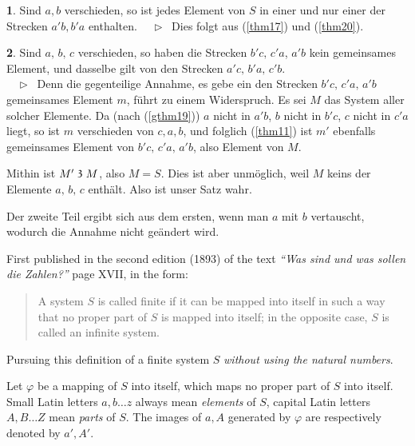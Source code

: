 \documentclass[leqno,hidelinks,a4paper]{article}
\theoremstyle{definition}
\newtheorem{satz}{\protect\satzname}
\newcommand{\satzname}{}
\renewcommand{\satzname}{\hspace{-4pt}.\ Satz}%
\renewcommand{\satzname}{\hspace{-4pt}.\ Theorem}%
\newcommand\Beweis{\medskip \newline $ \phantom{'.'} \rhd \ $}%
\newcommand\beweis{ $ \phantom{'.'} \rhd \ $}%
\newcommand\TeilVon{\mathrel{\raisebox{0.45ex}{$\mathfrak{3}$}}}
\begin{document}
\begin{paracol}{2}
\begin{satz}\label{gthm23}
Sind $a, b$ verschieden, so ist jedes Element von $S$ in einer und nur einer
der Strecken $a'b, b'a$ enthalten.
\Beweis
Dies folgt aus (\ref{thm17}) und (\ref{thm20}).
\end{satz}

\begin{satz}\label{gthm24}
Sind $a,\, b,\, c$ verschieden, so haben die Strecken $b'c,\, c'a$, $a'b$ kein
gemeinsames Element, und dasselbe gilt von den Strecken $a'c,\, b'a,\, c'b$.
\ \\

\noindent \beweis
Denn die gegenteilige Annahme, es gebe ein den Strecken $b'c,\, c'a,\, a'b$
gemeinsames Element $m$, führt zu einem Widerspruch. Es sei $M$ das System aller
solcher Elemente. Da (nach (\ref{gthm19})) $a$ nicht in $a'b$, $ b$ nicht in
$b'c$, $c$ nicht in $c'a$ liegt, so ist $m$ verschieden von $c, a, b$, und folglich
(\ref{thm11}) ist $m'$ ebenfalls gemeinsames Element von $b'c,\, c'a,\, a'b$,
also Element von $M$.

Mithin ist $M' \TeilVon M$, also $M = S$. Dies ist aber unmöglich, weil $M$ keins
der Elemente $a,\, b,\, c$ enthält. Also ist unser Satz wahr.

Der zweite Teil ergibt sich aus dem ersten, wenn man $a$ mit $b$ vertauscht,
wodurch die Annahme nicht geändert wird.
\end{satz}




\switchcolumn
{}

\noindent First published in the second edition (1893) of the text
\textit{``Was sind und was sollen die Zahlen?''} page XVII, in the form:%

\begin{quote}
A system $S$ is called finite if it can be mapped into itself in such a way that
no proper part of $S$ is mapped into itself; in the opposite case, $S$ is called
an infinite system.
\end{quote}

Pursuing this definition of a finite system $S$ \emph{without using the natural numbers}.

Let $\varphi$ be a mapping of $S$ into itself, which maps no proper part of $S$
into itself. Small Latin letters $a, b \ldots z$ always mean \emph{elements} of
$S$, capital Latin letters $A, B \ldots Z$ mean \emph{parts} of $S$. The images
of $a, A$ generated by $\varphi$ are respectively denoted by $a', A'$.
\ \\


\end{paracol}
\end{document}
